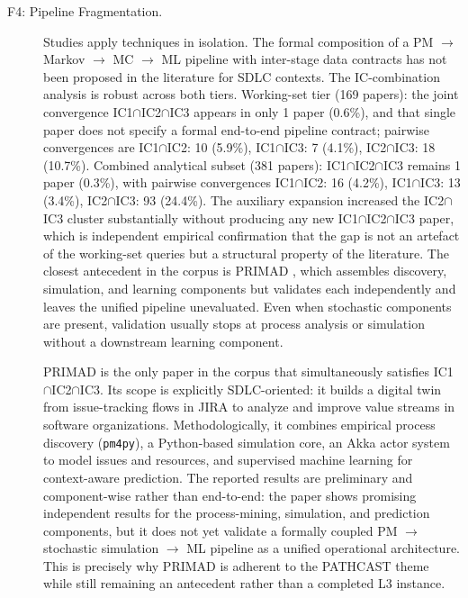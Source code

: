 \begin{description}
\item[F4: Pipeline Fragmentation.]
Studies apply techniques in isolation. The formal composition of a
PM $\rightarrow$ Markov $\rightarrow$ MC $\rightarrow$ ML pipeline with
inter-stage data contracts has not been proposed in the literature for SDLC
contexts. The IC-combination analysis is robust across both tiers.
Working-set tier (169 papers): the joint convergence
IC1$\cap$IC2$\cap$IC3 appears in only 1 paper (0.6\%), and that single
paper does not specify a formal end-to-end pipeline contract; pairwise
convergences are IC1$\cap$IC2: 10 (5.9\%), IC1$\cap$IC3: 7 (4.1\%),
IC2$\cap$IC3: 18 (10.7\%). Combined analytical subset (381 papers): IC1$\cap$IC2$\cap$IC3
remains 1 paper (0.3\%), with pairwise convergences IC1$\cap$IC2: 16
(4.2\%), IC1$\cap$IC3: 13 (3.4\%), IC2$\cap$IC3: 93 (24.4\%). The
auxiliary expansion increased the IC2$\cap$IC3 cluster substantially without
producing any new IC1$\cap$IC2$\cap$IC3 paper, which is independent
empirical confirmation that the gap is not an artefact of the working-set
queries but a structural property of the literature. The closest antecedent
in the corpus is PRIMAD \cite{guinea2025}, which assembles discovery,
simulation, and learning components but validates each independently and
leaves the unified pipeline unevaluated. Even when stochastic components are
present, validation usually stops at process analysis or simulation without
a downstream learning component.

PRIMAD is the only paper in the corpus that simultaneously satisfies
IC1$\cap$IC2$\cap$IC3. Its scope is explicitly SDLC-oriented: it builds a
digital twin from issue-tracking flows in JIRA to analyze and improve value
streams in software organizations. Methodologically, it combines empirical
process discovery (\texttt{pm4py}), a Python-based simulation core, an Akka
actor system to model issues and resources, and supervised machine learning
for context-aware prediction. The reported results are preliminary and
component-wise rather than end-to-end: the paper shows promising independent
results for the process-mining, simulation, and prediction components, but it
does not yet validate a formally coupled PM $\rightarrow$ stochastic
simulation $\rightarrow$ ML pipeline as a unified operational architecture.
This is precisely why PRIMAD is adherent to the PATHCAST theme while still
remaining an antecedent rather than a completed L3 instance.


\end{description}

